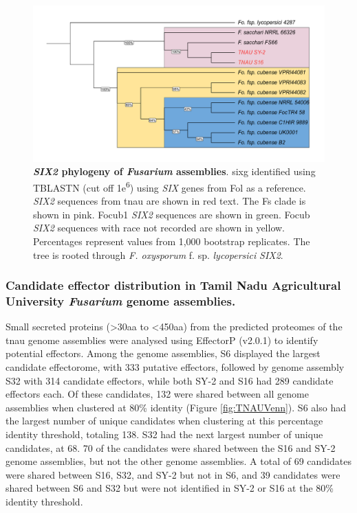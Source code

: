 \begin{figure}[htp!]
  \centering
  \includegraphics[width=15cm]{Figures/FusSIX2.Phylo.edited.pdf}
  \caption[\textit{SIX2} phylogeny of \textit{Fusarium} assemblies]{\textbf{\textit{SIX2} phylogeny of \textit{Fusarium} assemblies}. \acl{sixg} identified using TBLASTN (cut off 1\-e\textsuperscript{6}) using \textit{SIX} genes from \acl{Fol} as a reference. \textit{SIX2} sequences from \ac{tnau} are shown in red text. The \acl{Fs} clade is shown in pink. \Acl{Focub1} \textit{SIX2} sequences are shown in green. \acl{Focub} \textit{SIX2} sequences with race not recorded are shown in yellow. Percentages represent values from 1,000 bootstrap replicates. The tree is rooted through \textit{F. oxysporum} f. sp. \textit{lycopersici} \textit{SIX2}.}
  \label{fig:FusSIX2}
\end{figure}

\subsubsection{Candidate effector distribution in Tamil Nadu Agricultural University \textit{Fusarium} genome assemblies.}

Small secreted proteins (>30aa to <450aa)  from the predicted proteomes of the \ac{tnau} genome assemblies were analysed using EffectorP (v2.0.1) to identify potential effectors. Among the genome assemblies, S6 displayed the largest candidate effectorome, with 333 putative effectors, followed by genome assembly S32 with 314 candidate effectors, while both SY-2 and S16 had 289 candidate effectors each. Of these candidates, 132 were shared between all genome assemblies when clustered at 80\% identity (Figure \ref{fig:TNAUVenn}). S6 also had the largest number of unique candidates when clustering at this percentage identity threshold, totaling 138. S32 had the next largest number of unique candidates, at 68. 70 of the candidates were shared between the S16 and SY-2 genome assemblies, but not the other genome assemblies. A total of 69 candidates were shared between S16, S32, and SY-2 but not in S6, and 39 candidates were shared between S6 and S32 but were not identified in SY-2 or S16 at the  80\% identity threshold. 

